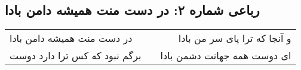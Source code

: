 \begin{center}
\section*{رباعی شماره ۲: در دست منت همیشه دامن بادا}
\label{sec:sh002}
\begin{longtable}{l p{0.5cm} r}
در دست منت همیشه دامن بادا
&&
و آنجا که ترا پای سر من بادا
\\
برگم نبود که کس ترا دارد دوست
&&
ای دوست همه جهانت دشمن بادا
\\
\end{longtable}
\end{center}
